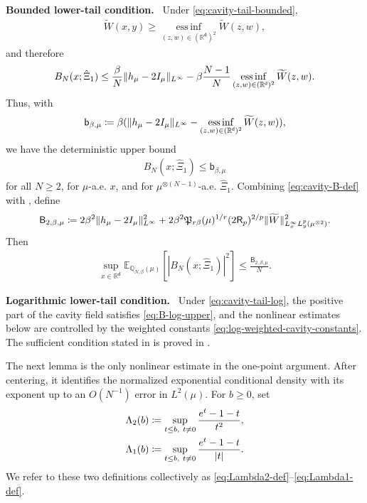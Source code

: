 \documentclass[11pt,reqno]{amsart}
\numberwithin{equation}{section}
\theoremstyle{plain}
\theoremstyle{remark}
\DeclarePairedDelimiter{\pa}{\lparen}{\rparen}
\DeclarePairedDelimiter{\abs}{\lvert}{\rvert}
\DeclarePairedDelimiter{\norm}{\lVert}{\rVert}
\renewcommand{\d}{\mathsf{d}}
\newcommand{\R}{{\mathbb{R}}}
\newcommand{\E}{{\mathbb{E}}}
\newcommand{\Q}{{\mathbb{Q}}}
\newcommand{\tl}{\widetilde}
\newcommand{\be}{\beta}
\newcommand{\parheading}[1]{\par\medskip\noindent\textbf{#1}\ }
\begin{document}
\parheading{Bounded lower-tail condition.}
Under \eqref{eq:cavity-tail-bounded},
\begin{align}\label{eq:g-tildeg-lb}
 \tl W(x,y)
 \ge \operatorname*{ess\,inf}_{(z,w)\in(\R^\d)^2}\tl W(z,w),
\end{align}
and therefore
\begin{align}\label{eq:B-upper-bound-expanded}
 B_N(x;\hat\Xi_1)
 \le \frac{\be}{N}\norm{h_\mu-2I_\mu}_{L^\infty}
 -\be\frac{N-1}{N}
 \operatorname*{ess\,inf}_{(z,w)\in(\R^\d)^2}\tl W(z,w).
\end{align}
Thus, with
\begin{align}\label{eq:b-cavity-bounded}
 \mathsf b_{\be,\mu}
 \coloneqq
 \be\pa{\norm{h_\mu-2I_\mu}_{L^\infty}
 -\operatorname*{ess\,inf}_{(z,w)\in(\R^\d)^2}\tl W(z,w)},
\end{align}
we have the deterministic upper bound
\begin{align}\label{eq:B-upper-bound}
 B_N(x;\hat\Xi_1)\le \mathsf b_{\be,\mu}
\end{align}
for all \(N\ge2\), for \(\mu\)-a.e. \(x\), and for \(\mu^{\otimes(N-1)}\)-a.e. \(\hat\Xi_1\).  Combining \eqref{eq:cavity-B-def} with , define
\begin{align}\label{eq:B2-cavity-bounded-constant}
 \mathsf B_{2,\be,\mu}
 \coloneqq
 2\be^2\norm{h_\mu-2I_\mu}_{L^\infty}^2
 +2\be^2\mathfrak P_{r\be}(\mu)^{1/r}
       (2\mathsf R_p)^{2/p}
       \norm{\tl W}_{L_x^\infty L_y^p(\mu^{\otimes2})}^2.
\end{align}
Then
\begin{align}\label{eq:B-second-pointwise}
 \sup_{x\in\R^\d}\E_{\Q_{N,\be}(\mu)}\left[|B_N(x;\hat\Xi_1)|^2\right]
 \le \frac{\mathsf B_{2,\be,\mu}}{N}.
\end{align}

\parheading{Logarithmic lower-tail condition.}
Under \eqref{eq:cavity-tail-log}, the positive part of the cavity field satisfies \eqref{eq:B-log-upper}, and the nonlinear estimates below are controlled by the weighted constants \eqref{eq:log-weighted-cavity-constants}.  The sufficient condition stated in  is proved in .

The next lemma is the only nonlinear estimate in the one-point argument.  After centering, it identifies the normalized exponential conditional density with its exponent up to an \(O(N^{-1})\) error in \(L^2(\mu)\).  For \(b\ge0\), set
\begin{align}
 \Lambda_2(b)&\coloneqq\sup_{t\le b,\ t\ne0}\frac{e^t-1-t}{t^2},\label{eq:Lambda2-def}\\
 \Lambda_1(b)&\coloneqq\sup_{t\le b,\ t\ne0}\frac{e^t-1-t}{\abs{t}}.\label{eq:Lambda1-def}
\end{align}
We refer to these two definitions collectively as \eqref{eq:Lambda2-def}--\eqref{eq:Lambda1-def}.
\end{document}
